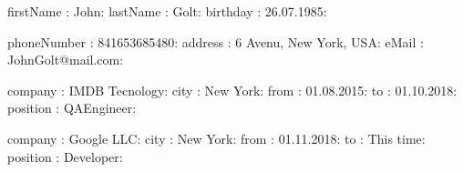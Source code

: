 
firstName : John:
lastName : Golt:
birthday : 26.07.1985:


phoneNumber : 841653685480:
address : 6 Avenu, New York, USA:
eMail : JohnGolt@mail.com:


company : IMDB Tecnology:
city : New York:
from : 01.08.2015:
to : 01.10.2018:
position : QAEngineer:

company : Google LLC:
city : New York:
from : 01.11.2018:
to  : This time:
position : Developer:


